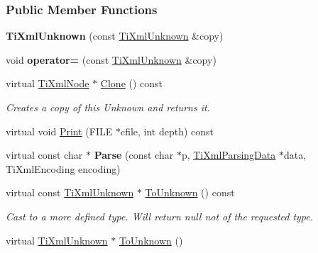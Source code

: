 \subsubsection*{Public Member Functions}
\begin{DoxyCompactItemize}
\item 
\hypertarget{class_ti_xml_unknown_abe798ff4feea31474850c7f0de6bdf5e}{
{\bfseries TiXmlUnknown} (const \hyperlink{class_ti_xml_unknown}{TiXmlUnknown} \&copy)}
\label{class_ti_xml_unknown_abe798ff4feea31474850c7f0de6bdf5e}

\item 
\hypertarget{class_ti_xml_unknown_a5097fe228cd5ad4edcdddf02c334fd83}{
void {\bfseries operator=} (const \hyperlink{class_ti_xml_unknown}{TiXmlUnknown} \&copy)}
\label{class_ti_xml_unknown_a5097fe228cd5ad4edcdddf02c334fd83}

\item 
\hypertarget{class_ti_xml_unknown_a675c4b2684af35e4c7649b7fd5ae598d}{
virtual \hyperlink{class_ti_xml_node}{TiXmlNode} $\ast$ \hyperlink{class_ti_xml_unknown_a675c4b2684af35e4c7649b7fd5ae598d}{Clone} () const }
\label{class_ti_xml_unknown_a675c4b2684af35e4c7649b7fd5ae598d}

\begin{DoxyCompactList}\small\item\em Creates a copy of this Unknown and returns it. \item\end{DoxyCompactList}\item 
virtual void \hyperlink{class_ti_xml_unknown_a025f19c21ef01ea9be50febb8fe0ba06}{Print} (FILE $\ast$cfile, int depth) const 
\item 
\hypertarget{class_ti_xml_unknown_aa51c2694e4177b5f0b5429ee5a81b58d}{
virtual const char $\ast$ {\bfseries Parse} (const char $\ast$p, \hyperlink{class_ti_xml_parsing_data}{TiXmlParsingData} $\ast$data, TiXmlEncoding encoding)}
\label{class_ti_xml_unknown_aa51c2694e4177b5f0b5429ee5a81b58d}

\item 
\hypertarget{class_ti_xml_unknown_ab0313e5fe77987d746ac1a97a254419d}{
virtual const \hyperlink{class_ti_xml_unknown}{TiXmlUnknown} $\ast$ \hyperlink{class_ti_xml_unknown_ab0313e5fe77987d746ac1a97a254419d}{ToUnknown} () const }
\label{class_ti_xml_unknown_ab0313e5fe77987d746ac1a97a254419d}

\begin{DoxyCompactList}\small\item\em Cast to a more defined type. Will return null not of the requested type. \item\end{DoxyCompactList}\item 
\hypertarget{class_ti_xml_unknown_a67c9fd22940e8c47f706a72cdd2e332c}{
virtual \hyperlink{class_ti_xml_unknown}{TiXmlUnknown} $\ast$ \hyperlink{class_ti_xml_unknown_a67c9fd22940e8c47f706a72cdd2e332c}{ToUnknown} ()}
\label{class_ti_xml_unknown_a67c9fd22940e8c47f706a72cdd2e332c}


\end{DoxyCompactItemize}
